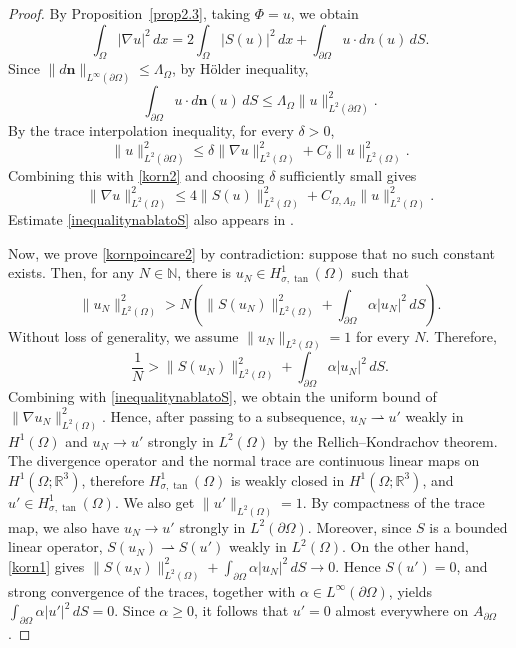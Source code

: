 \documentclass[11pt,reqno]{amsart}
\theoremstyle{plain}
\numberwithin{equation}{section}
\begin{document}
\begin{proof}
    By Proposition~\ref{prop2.3}, taking $\Phi=u$, we obtain
    \begin{equation}\label{korn2}
    \int_\Omega|\nabla u|^2\,dx=2\int_\Omega|S(u)|^2\,dx+\int_{\partial\Omega}u\cdot d{n}(u)\,dS.
    \end{equation}
    Since $\|d\boldsymbol n\|_{L^\infty(\partial\Omega)}\le\Lambda_\Omega$,  by H\"older inequality, 
    \[
    \int_{\partial\Omega}u\cdot d\boldsymbol n(u)\,dS
    \le \Lambda_\Omega\|u\|_{L^2(\partial\Omega)}^2.
    \]
    By the trace interpolation inequality, for every $\delta>0$,
    \[
    \|u\|_{L^2(\partial\Omega)}^2
    \le \delta\|\nabla u\|_{L^2(\Omega)}^2+C_\delta\|u\|_{L^2(\Omega)}^2.
    \]
    Combining this with \eqref{korn2} and choosing $\delta$ sufficiently small gives
    \begin{equation}\label{inequalitynablatoS}
    \|\nabla u\|^2_{L^2(\Omega)}\le 4\|S(u)\|^2_{L^2(\Omega)}+C_{\Omega,\Lambda_\Omega}\|u\|^2_{L^2(\Omega)}.
    \end{equation}
Estimate \eqref{inequalitynablatoS} also appears in
\cite[Proposition~5.1, Step~1]{Kelliher2025}.
    
    Now, we prove \eqref{kornpoincare2} by contradiction: suppose that no such constant exists. Then, for any $N\in\mathbb{N}$, there is $u_N\in H^1_{\sigma,\tan}(\Omega)$ such that 
    \begin{equation}
    \|u_N\|^2_{L^2(\Omega)}>N\left(\|S(u_N)\|_{L^2(\Omega)}^2+\int_{\partial\Omega}\alpha|u_N|^2\,dS\right).
    \end{equation}
    Without loss of generality, we assume $\|u_N\|_{L^2(\Omega)}=1$ for every $N$.
    Therefore,
    \begin{equation}\label{korn1}
    \frac{1}{N}>\|S(u_N)\|_{L^2(\Omega)}^2+\int_{\partial\Omega}\alpha|u_N|^2\,dS.
    \end{equation}
    Combining with \eqref{inequalitynablatoS}, we obtain the uniform bound of $\|\nabla u_N\|^2_{L^2(\Omega)}$.
    Hence, after passing to a subsequence, $u_N\rightharpoonup u'$ weakly in $H^1(\Omega)$ and $u_N\to u'$ strongly in $L^2(\Omega)$ by the Rellich--Kondrachov theorem.
    {The divergence operator and the normal trace are continuous
    linear maps on \(H^1(\Omega;\mathbb R^3)\), therefore
    \(H^1_{\sigma,\tan}(\Omega)\) is weakly closed in \(H^1(\Omega;\mathbb
    R^3)\), and \(u'\in H^1_{\sigma,\tan}(\Omega)\).}
    We also get $\|u'\|_{L^2(\Omega)}=1$. By compactness of the trace map, we also have $u_N\rightarrow u'$ strongly in $L^2(\partial\Omega)$. Moreover, since $S$ is a bounded linear operator, $S(u_N)\rightharpoonup S(u')$ weakly in $L^2(\Omega)$. On the other hand, \eqref{korn1} gives $\|S(u_N)\|_{L^2(\Omega)}^2+\int_{\partial\Omega}\alpha|u_N|^2\,dS\to0$. Hence $S(u')=0$, and strong convergence of the traces, together with $\alpha\in L^\infty(\partial\Omega)$, yields $\int_{\partial\Omega}\alpha|u'|^2\,dS=0$. Since $\alpha\ge0$, it follows that $u'=0$ almost everywhere on $A_{\partial\Omega}$.
    

\end{proof}
\end{document}
